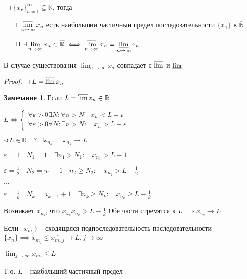 \documentclass{book}
\newcommand\R{\ensuremath{\mathbb{R}}}
\newcommand{\ov}[1]{\overline{#1}}
\theoremstyle{definition}
\newtheorem*{note}{Замечание}
\begin{document}
\begin{theorem}
    $\sqsupset \{x_{n} \}_{n=1}^{\infty }\subseteq \R$, тогда 
    \begin{enumerate}
        \item [I] $\varlimsup\limits_{n\to \infty }x_{n} $ есть наибольший частичный предел последовательности $\{x_{n} \}$ в $\ov \R$ 
        \item [II] $\exists \lim_{n \to \infty} x_{n} \in \ov \R \iff \varlimsup\limits_{n\to \infty } x_{n}  = \varliminf\limits_{n \to \infty }x_{n} $
    \end{enumerate}

    В случае существования $\lim_{n \to \infty} x_{n} $ совпадает с $\varlimsup$ и  $\varliminf$
\end{theorem}
\begin{proof}
    $\sqsupset L = \varlimsup x_{n} $

    \begin{note}
        Если $ L = \varlimsup x_{n} \in \R$

        $L \iff \begin{cases}
            \forall \varepsilon > 0 \exists N: \forall n>N\quad x_{n} <L+\varepsilon\\
            \forall \varepsilon>0 \forall N: \exists n>N:\quad x_{n} >L-\varepsilon
        \end{cases}$
    \end{note}

    $\sphericalangle L\in \R\quad ?: \exists x_{n_k}:\quad x_{n_k} \to L$

    $\varepsilon = 1\quad N_1 = 1\quad \exists n_1>N_1:\quad x_{n_1}>L-1$

    $\varepsilon = \frac{1}{2}\quad N_2 = n_1+1\quad n_2\geqslant N_2:\quad x_{n_2}>L-\frac{1}{2}$ 

    $\ldots$

    $\varepsilon = \frac{1}{k}\quad N_{k} = n_{k-1}+1\quad \exists n_k\geqslant N_k:\quad x_{n_k} \geqslant L - \frac{1}{k}$ 

    Возникает $x_{n_k}$, что  $\ov{x_{n_k}} x_{n_k} >L-\frac{1}{k}$ Обе части стремятся к $L \implies x_{n_k} \to L$

    Если $\{x_{m_j}\}$ -- сходящаяся  подпоследовательность последовательности $\{x_{n} \} \implies x_{m_j}\leqslant  \ov{x_{m_\leqslant j}}\to L, j\to \infty $

    $\lim_{j \to \infty} x_{m_j}\leqslant L $

    Т.о. $L$ -- наибольший частичный предел


\end{proof}
\end{document}
